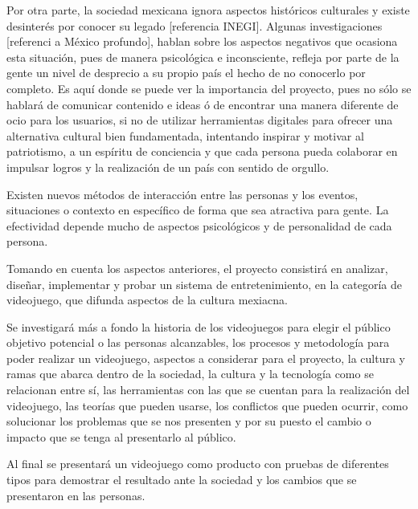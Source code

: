 Por otra parte, la sociedad mexicana ignora aspectos históricos culturales y existe desinterés por conocer su legado
[referencia INEGI]. Algunas investigaciones [referenci a México profundo], hablan sobre los aspectos negativos que 
ocasiona esta situación, pues de manera psicológica e inconsciente, refleja por parte de la gente un nivel de desprecio
a su propio país el hecho de no conocerlo por completo. Es aquí donde se puede ver la importancia del proyecto, pues no
sólo se hablará de comunicar contenido e ideas ó de encontrar una manera diferente de ocio para los usuarios, 
si no de utilizar herramientas digitales para %
ofrecer una alternativa cultural bien fundamentada, intentando inspirar y motivar al patriotismo, 
a un espíritu de conciencia y que cada persona pueda colaborar en impulsar logros y la realización 
de un país con sentido de orgullo.

Existen nuevos métodos de interacción entre las personas y los eventos, situaciones o contexto en específico de forma 
que sea atractiva para gente. La efectividad depende mucho de aspectos psicológicos y de personalidad de cada persona.

Tomando en cuenta los aspectos anteriores, el proyecto consistirá en %
analizar, diseñar, implementar y probar un sistema de entretenimiento, en la categoría de videojuego, 
que %
difunda aspectos de la cultura mexiacna.

Se investigará más a fondo la historia de los videojuegos para elegir el público objetivo potencial o las personas alcanzables, los procesos y metodología para poder realizar un videojuego, aspectos a considerar para el proyecto, la cultura y ramas que abarca dentro de la sociedad, la cultura y la tecnología como se relacionan entre sí, las herramientas con las que se cuentan para la realización del videojuego, las teorías que pueden usarse, los conflictos que pueden ocurrir, como solucionar los problemas que se nos presenten y por su puesto el cambio o impacto que se tenga al presentarlo al público.

Al final se presentará un videojuego como producto con pruebas de diferentes tipos para demostrar el resultado ante la sociedad y los cambios que se presentaron en las personas.
